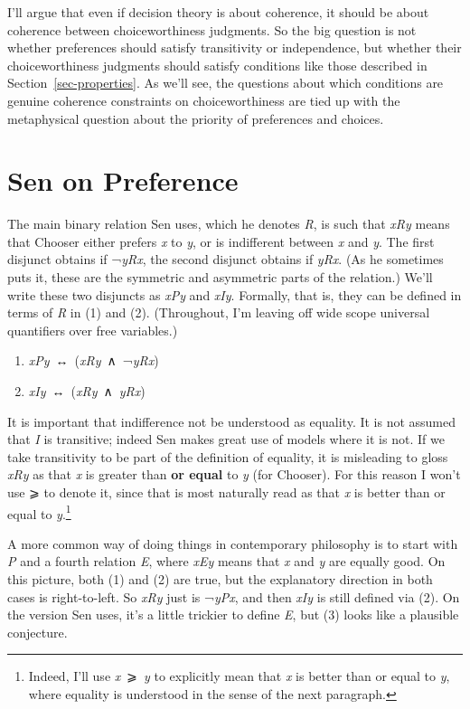 \documentclass[
  11pt,
  letterpaper,
  DIV=11,
  numbers=noendperiod,
  twoside]{scrartcl}
\providecommand{\tightlist}{%
  \setlength{\itemsep}{0pt}\setlength{\parskip}{0pt}}
\begin{document}
I'll argue that even if decision theory is about coherence, it should be
about coherence between choiceworthiness judgments. So the big question
is not whether preferences should satisfy transitivity or independence,
but whether their choiceworthiness judgments should satisfy conditions
like those described in Section~\ref{sec-properties}. As we'll see, the
questions about which conditions are genuine coherence constraints on
choiceworthiness are tied up with the metaphysical question about the
priority of preferences and choices.

\section{Sen on Preference}\label{sec-sen}

The main binary relation Sen uses, which he denotes \emph{R}, is such
that \emph{xRy} means that Chooser either prefers \emph{x} to \emph{y},
or is indifferent between \emph{x} and \emph{y}. The first disjunct
obtains if ¬\emph{yRx}, the second disjunct obtains if \emph{yRx}. (As
he sometimes puts it, these are the symmetric and asymmetric parts of
the relation.) We'll write these two disjuncts as \emph{xPy} and
\emph{xIy}. Formally, that is, they can be defined in terms of \emph{R}
in (1) and (2). (Throughout, I'm leaving off wide scope universal
quantifiers over free variables.)

\begin{enumerate}
\def\labelenumi{(\arabic{enumi})}
\tightlist
\item
  \emph{xPy}~↔︎~(\emph{xRy}~∧~¬\emph{yRx})
\item
  \emph{xIy}~↔︎~(\emph{xRy}~∧~\emph{yRx})
\end{enumerate}

It is important that indifference not be understood as equality. It is
not assumed that \emph{I} is transitive; indeed Sen makes great use of
models where it is not. If we take transitivity to be part of the
definition of equality, it is misleading to gloss \emph{xRy} as that
\emph{x} is greater than \textbf{or equal} to \emph{y} (for Chooser).
For this reason I won't use ⩾ to denote it, since that is most naturally
read as that \emph{x} is better than or equal to \emph{y}.\footnote{Indeed,
  I'll use \emph{x}~⩾~\emph{y} to explicitly mean that \emph{x} is
  better than or equal to \emph{y}, where equality is understood in the
  sense of the next paragraph.}

A more common way of doing things in contemporary philosophy is to start
with \emph{P} and a fourth relation \emph{E}, where \emph{xEy} means
that \emph{x} and \emph{y} are equally good. On this picture, both (1)
and (2) are true, but the explanatory direction in both cases is
right-to-left. So \emph{xRy} just is ¬\emph{yPx}, and then \emph{xIy} is
still defined via (2). On the version Sen uses, it's a little trickier
to define \emph{E}, but (3) looks like a plausible conjecture.
\end{document}
